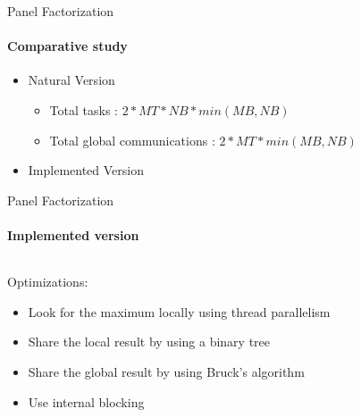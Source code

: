 \begin{frame}{Panel Factorization}
\framesubtitle{Comparative study}
\begin{itemize}
\item Natural Version
\begin{exampleblock}{}
\begin{itemize}
\item Total tasks : $2 * MT * NB * min(MB,NB)$
\item Total global communications : $2 * MT * min(MB,NB)$
\end{itemize}
\end{exampleblock}{}
\item Implemented Version
\end{itemize}
\end{frame}

\begin{frame}{Panel Factorization}
\framesubtitle{Implemented version}
\begin{columns}
\begin{column}{.70\textwidth}
Optimizations:
\begin{itemize}
\item Look for the maximum locally using thread parallelism
\item Share the local result by using a binary tree
\item Share the global result by using Bruck's algorithm
\item Use internal blocking
\end{itemize}
\end{column}
\hfill
\begin{column}{.30\textwidth}
\end{column}
\end{columns}
\end{frame}

